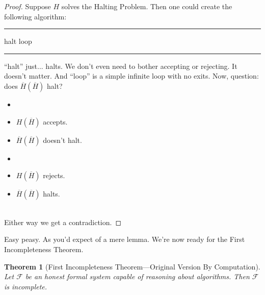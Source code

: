 \documentclass{article}
\newtheorem{theorem}{Theorem}
\newcommand{\F}{\ensuremath{\mathcal{F}}}
\newenvironment{algo}{\begin{samepage}\medskip\hrule\begin{algorithmic}[H]}{\end{algorithmic}\hrule\medskip\end{samepage}}
\begin{document}
\begin{proof}
Suppose $H$ solves the Halting Problem. Then one could create the following algorithm:
\begin{algo}
    \State halt
  \EndIf
    \State loop
  \EndIf
\EndFunction
\end{algo}
``halt'' just... halts. We don't even need to bother accepting or rejecting. It doesn't matter. And ``loop'' is a simple infinite loop with no exits. Now, question: does $\overline{H}(\overline{H})$ halt?\\[0.5em]
\begin{minipage}{0.5\textwidth}
\begin{description}[noitemsep]
\item[Either $\overline{H}(\overline{H})$ halts:]
\begin{itemize}[noitemsep]
\item[]
\item $H(\overline{H})$ accepts.
\item $\overline{H}(\overline{H})$ doesn't halt. \lightning
\end{itemize}
\end{description}
\end{minipage}
\begin{minipage}{0.5\textwidth}
\begin{description}[noitemsep]
\item[Or $\overline{H}(\overline{H})$ doesn't halt:]
\begin{itemize}[noitemsep]
\item[]
\item $H(\overline{H})$ rejects.
\item $\overline{H}(\overline{H})$ halts. \lightning
\end{itemize}
\end{description}
\end{minipage}\\[1em]
Either way we get a contradiction.
\end{proof}

Easy peasy. As you'd expect of a mere lemma. We're now ready for the First Incompleteness Theorem.

\begin{theorem}[First Incompleteness Theorem---Original Version By Computation]
\label{original-first-by-computation}
Let $\F$ be an honest formal system capable of reasoning about algorithms. Then $\F$ is incomplete.
\end{theorem}
\end{document}
